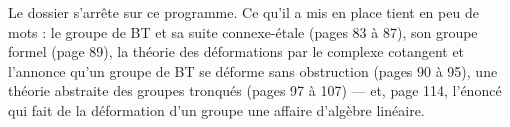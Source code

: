 \documentclass[11pt,a4paper]{article}
\begin{document}
Le dossier s'arrête sur ce programme. Ce qu'il a mis en place tient en
peu de mots : le groupe de BT et sa suite connexe-étale (pages 83 à 87),
son groupe formel (page 89), la théorie des déformations par le complexe
cotangent et l'annonce qu'un groupe de BT se déforme sans obstruction
(pages 90 à 95), une théorie abstraite des groupes tronqués (pages 97 à
107) — et, page 114, l'énoncé qui fait de la déformation d'un groupe une
affaire d'algèbre linéaire.
\end{document}
